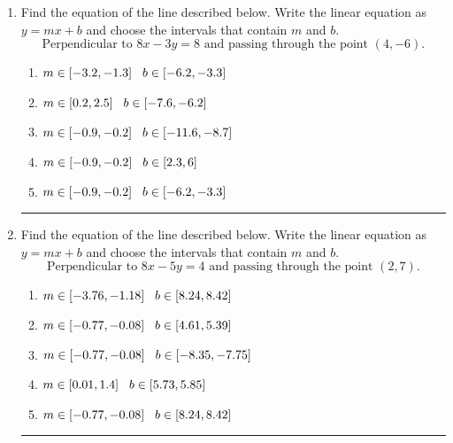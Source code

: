 \documentclass[14pt]{extbook}
\newcommand{\litem}[1]{\item#1\hspace*{-1cm}\rule{\textwidth}{0.4pt}}
\begin{document}
\begin{enumerate}
{\begin{enumerate}[label=\Alph*.]
\end{enumerate} }
\litem{
Find the equation of the line described below. Write the linear equation as $ y=mx+b $ and choose the intervals that contain $m$ and $b$.\[ \text{Perpendicular to } 8 x - 3 y = 8 \text{ and passing through the point } (4, -6). \]\begin{enumerate}[label=\Alph*.]
\item \( m \in [-3.2, -1.3] \hspace*{3mm} b \in [-6.2, -3.3] \)
\item \( m \in [0.2, 2.5] \hspace*{3mm} b \in [-7.6, -6.2] \)
\item \( m \in [-0.9, -0.2] \hspace*{3mm} b \in [-11.6, -8.7] \)
\item \( m \in [-0.9, -0.2] \hspace*{3mm} b \in [2.3, 6] \)
\item \( m \in [-0.9, -0.2] \hspace*{3mm} b \in [-6.2, -3.3] \)

\end{enumerate} }
\litem{
Find the equation of the line described below. Write the linear equation as $ y=mx+b $ and choose the intervals that contain $m$ and $b$.\[ \text{Perpendicular to } 8 x - 5 y = 4 \text{ and passing through the point } (2, 7). \]\begin{enumerate}[label=\Alph*.]
\item \( m \in [-3.76, -1.18] \hspace*{3mm} b \in [8.24, 8.42] \)
\item \( m \in [-0.77, -0.08] \hspace*{3mm} b \in [4.61, 5.39] \)
\item \( m \in [-0.77, -0.08] \hspace*{3mm} b \in [-8.35, -7.75] \)
\item \( m \in [0.01, 1.4] \hspace*{3mm} b \in [5.73, 5.85] \)
\item \( m \in [-0.77, -0.08] \hspace*{3mm} b \in [8.24, 8.42] \)


\end{enumerate}}
\end{enumerate}
\end{document}
